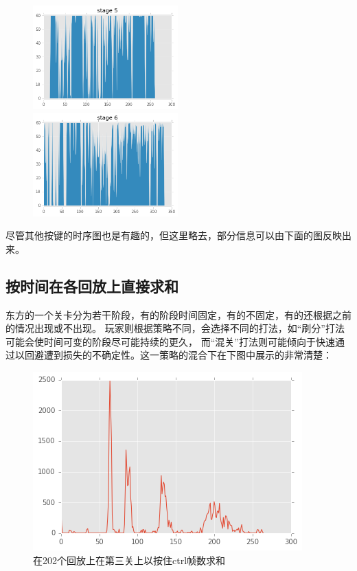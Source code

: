 \documentclass[UTF8]{ctexart}
\begin{document}
\begin{figure}[H]
\begin{minipage}[t]{0.5\linewidth}
\centering
\includegraphics[width=2.2in]{images/pressingShift5.png}
\end{minipage}
\begin{minipage}[t]{0.5\linewidth}
\centering
\includegraphics[width=2.2in]{images/pressingShift6.png}
\end{minipage}
\end{figure}

尽管其他按键的时序图也是有趣的，但这里略去，部分信息可以由下面的图反映出来。

\subsection{按时间在各回放上直接求和}

东方的一个关卡分为若干阶段，有的阶段时间固定，有的不固定，有的还根据之前的情况出现或不出现。
玩家则根据策略不同，会选择不同的打法，如“刷分”打法可能会使时间可变的阶段尽可能持续的更久，
而“混关”打法则可能倾向于快速通过以回避遭到损失的不确定性。这一策略的混合下在下图中展示的非常清楚：

\begin{figure}[H]
\centering
\includegraphics[width=\linewidth]{images/pressingCtrlSum.png}
\caption{在202个回放上在第三关上以按住ctrl帧数求和}
\end{figure}
\end{document}
